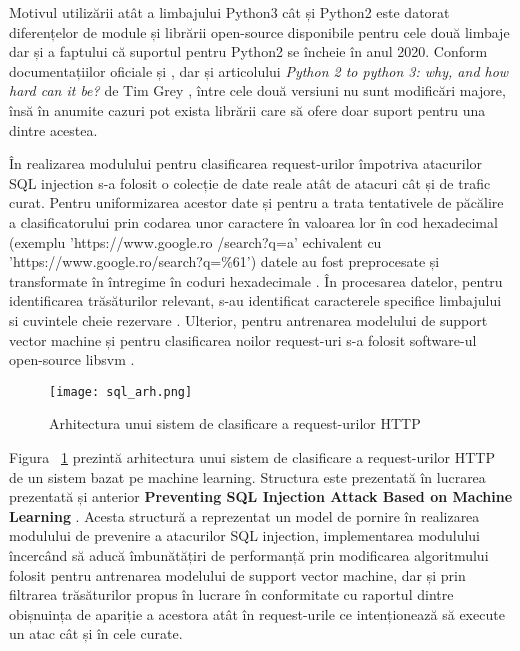 Motivul utilizării atât a limbajului Python3 cât și Python2 este datorat diferențelor de module și librării open-source disponibile pentru cele două limbaje dar și a faptului că suportul pentru Python2 se încheie în anul 2020. Conform documentațiilor oficiale  \cite{python3_doc} și \cite{python2_doc}, dar și articolului \textit{Python 2 to python 3: why, and how hard can it be?} de Tim Grey \cite{why_python3},  între cele două versiuni nu sunt modificări majore, însă în anumite cazuri pot exista librării care să ofere doar suport pentru una dintre acestea. 

În realizarea modulului pentru clasificarea request-urilor împotriva atacurilor SQL injection s-a folosit o colecție de date reale atât de atacuri cât și de trafic curat. Pentru uniformizarea acestor date și pentru a trata tentativele de păcălire a clasificatorului prin codarea unor caractere în valoarea lor în cod hexadecimal (exemplu 'https://www.google.ro /search?q=a' echivalent cu 'https://www.google.ro/search?q=\%61') datele au fost preprocesate și transformate în întregime în coduri hexadecimale  \cite{ascii}.  În procesarea datelor, pentru identificarea trăsăturilor relevant, s-au identificat caracterele specifice limbajului \cite{char_sql} si cuvintele cheie rezervare \cite{key_sql}. Ulterior, pentru antrenarea modelului de support vector machine și pentru clasificarea noilor request-uri s-a folosit software-ul open-source libsvm \cite{libsvm_class}. 

\begin{figure}[h]
	\centering
	\texttt{[image: sql\_arh.png]}
	\caption{Arhitectura unui sistem de clasificare a request-urilor HTTP}
	\label{fig:sql-arh}
\end{figure}

Figura ~\ref{fig:sql-arh}  prezintă arhitectura unui sistem de clasificare a request-urilor HTTP de un sistem bazat pe machine learning. Structura este prezentată în lucrarea prezentată și anterior  \textbf{Preventing SQL Injection Attack Based on Machine Learning} \cite{sqli_how}.  Acesta structură a reprezentat un model de pornire în realizarea modulului de prevenire a atacurilor SQL injection, implementarea modulului încercând să aducă îmbunătățiri de performanță prin modificarea algoritmului folosit pentru antrenarea modelului de support vector machine, dar și prin filtrarea trăsăturilor propus în lucrare în conformitate cu raportul dintre obișnuința de apariție a acestora atât în request-urile ce intenționează să execute un atac cât și în cele curate. 


